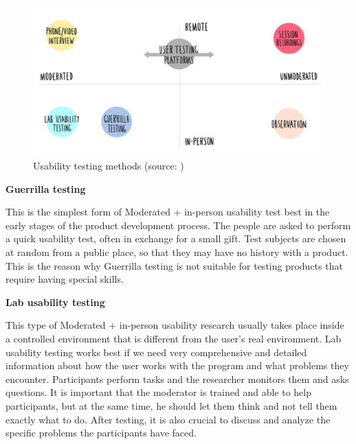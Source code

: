\documentclass[a4paper,10pt,twoside]{article}
\begin{document}
\vspace{0.3cm}
\begin{figure}[hbt!] 
\begin{center}
\includegraphics[width=13cm]{../pictures/usability_testing_methods.png} 
\caption[Usability testing methods]{Usability testing methods (source: \cite{hotjar})}
\label{fig:usability_testing_methods}
\end{center}
\end{figure}

\noindent \textbf {Guerrilla testing}

\noindent This is the simplest form of Moderated + in-person usability
test best in the early stages of the product development process. The
people are asked to perform a quick usability test, often in exchange
for a small gift. Test subjects are chosen at random from a public
place, so that they may have no history with a product. This is the
reason why Guerrilla testing is not suitable for testing products that
require having special skills.

\smallskip

\noindent \textbf {Lab usability testing}

\noindent This type of Moderated + in-person usability research
usually takes place inside a controlled environment that is different
from the user’s real environment. Lab usability testing works best if
we need very comprehensive and detailed information about how the user
works with the program and what problems they encounter. Participants
perform tasks and the researcher monitors them and asks questions. It
is important that the moderator is trained and able to help
participants, but at the same time, he should let them think and not
tell them exactly what to do. After testing, it is also crucial to
discuss and analyze the specific problems the participants have faced.
\end{document}
